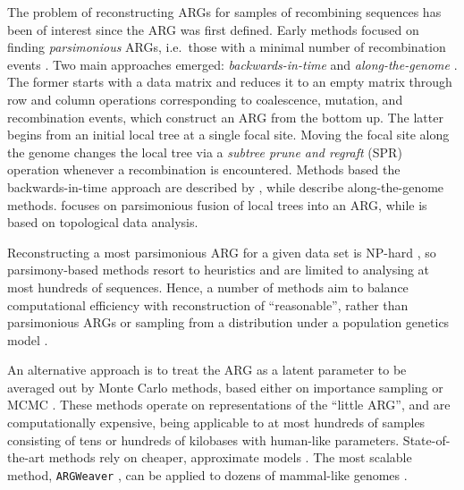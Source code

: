 \documentclass{article}
\begin{document}
The problem of reconstructing ARGs for samples of recombining sequences has
been of interest since the ARG was first defined. Early methods focused on
finding \emph{parsimonious} ARGs, i.e.\ those with a minimal number of
recombination events \citep{hein1990reconstructing}. Two main approaches
emerged: \emph{backwards-in-time} \citep{lyngso2005minimum} and
\emph{along-the-genome} \citep{song2003parsimonious, song2005constructing}. The
former starts with a data matrix and reduces it to an empty matrix through row
and column operations corresponding to coalescence, mutation, and recombination
events, which construct an ARG from the bottom up. The latter begins from an
initial local tree at a single focal site. Moving the focal site along the
genome changes the local tree via a \emph{subtree prune and regraft} (SPR)
operation whenever a recombination is encountered. Methods based the
backwards-in-time approach are described by \citet{song2005efficient,
wu2008association, thao2019hybrid, ignatieva2021kwarg}, while
\citet{hein1993heuristic, wu2011new, mirzaei2017rent} describe along-the-genome
methods. \citet{rasmussen2022espalier} focuses on parsimonious fusion of local
trees into an ARG, while \citet{camara2016inference} is based on topological
data analysis.

Reconstructing a most parsimonious ARG for a given data set is NP-hard
\citep{wang2001perfect}, so parsimony-based methods resort to heuristics and
are limited to analysing at most hundreds of sequences. Hence, a number of
methods aim to balance computational efficiency with reconstruction of
``reasonable'', rather than parsimonious ARGs or sampling from a
distribution under a population genetics model
\citep{minichiello2006mapping,
parida2008estimating, kelleher2019inferring,  speidel2019method,
schaefer2021ancestral, zhang2023biobank}.


An alternative approach is to treat the ARG as a latent parameter to be
averaged out by Monte Carlo methods, based either on importance sampling
\citep{griffiths1996ancestral, fearnhead2001estimating, jenkins2011inference}
or MCMC \citep{kuhner2000maximum, kuhner2006lamarc, nielsen2000estimation, wang2008bayesian,
wang2009population, fallon2013acg, vaughan2017inferring, mahmoudi2022bayesian}.
These methods operate on representations
of the ``little ARG'', and are computationally expensive, being
applicable to at most hundreds of samples consisting of tens or hundreds of
kilobases with human-like parameters.
State-of-the-art methods rely on cheaper,
approximate models \citep{didelot2010inference, heine2018bridging,
hubisz2020mapping,hubisz2020inference, medina2020speeding}. The most scalable
method, \texttt{ARGWeaver} \citep{rasmussen2014genome}, can be applied to
dozens of mammal-like genomes \citep{hubisz2020inference}.
\end{document}
